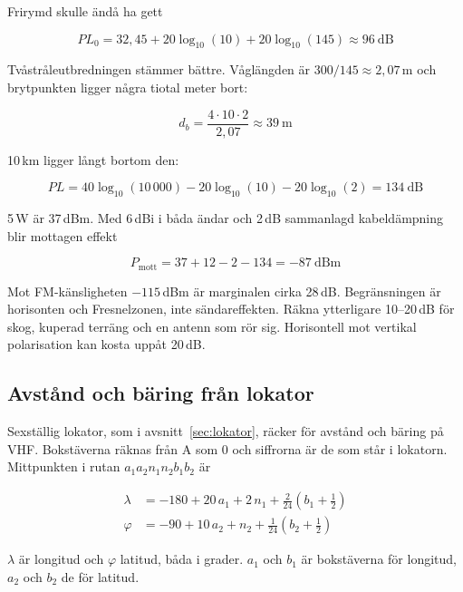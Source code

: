 Frirymd skulle ändå ha gett

\begin{equation}
	PL_0 = 32,45 + 20\log_{10}(10) + 20\log_{10}(145) \approx 96~\mathrm{dB}
\end{equation}

Tvåstråleutbredningen stämmer bättre. Våglängden är
$300/145 \approx 2,07$\,m och brytpunkten ligger några tiotal meter bort:

\begin{equation}
	d_b = \frac{4 \cdot 10 \cdot 2}{2,07} \approx 39~\mathrm{m}
\end{equation}

10\,km ligger långt bortom den:

\begin{equation}
	PL = 40\log_{10}(10\,000) - 20\log_{10}(10) - 20\log_{10}(2) = 134~\mathrm{dB}
\end{equation}

5\,W är 37\,dBm. Med 6\,dBi i båda ändar och 2\,dB sammanlagd kabeldämpning
blir mottagen effekt

\begin{equation}
	P_{\mathrm{mott}} = 37 + 12 - 2 - 134 = -87~\mathrm{dBm}
\end{equation}

Mot FM-känsligheten $-115$\,dBm är marginalen cirka 28\,dB. Begränsningen
är horisonten och Fresnelzonen, inte sändareffekten. Räkna ytterligare
10--20\,dB för skog, kuperad terräng och en antenn som rör sig.
Horisontell mot vertikal polarisation kan kosta uppåt 20\,dB.

\subsection{Avstånd och bäring från lokator}

Sexställig lokator, som i avsnitt~\ref{sec:lokator}, räcker för avstånd
och bäring på VHF. Bokstäverna räknas från A som 0 och siffrorna är de
som står i lokatorn. Mittpunkten i rutan $a_1 a_2 n_1 n_2 b_1 b_2$ är

\begin{align}
	\lambda &= -180 + 20\,a_1 + 2\,n_1 + \frac{2}{24}\left(b_1 + \frac{1}{2}\right) \\
	\varphi &= -90 + 10\,a_2 + n_2 + \frac{1}{24}\left(b_2 + \frac{1}{2}\right)
\end{align}

$\lambda$ är longitud och $\varphi$ latitud, båda i grader. $a_1$ och
$b_1$ är bokstäverna för longitud, $a_2$ och $b_2$ de för latitud.

